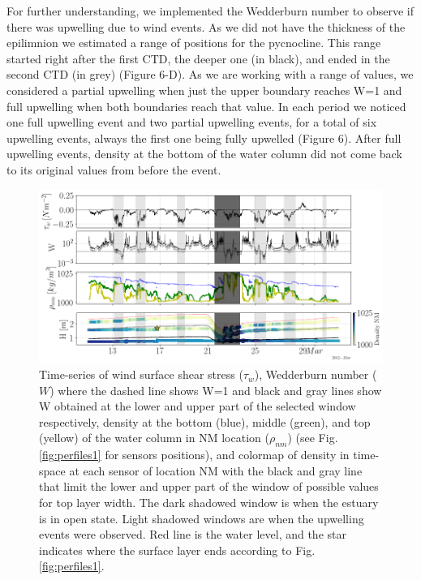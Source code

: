 \documentclass[tesis.tex]{subfiles}
\begin{document}
For further understanding, we implemented the Wedderburn number to observe if there was upwelling due to wind events. As we did not have the thickness of the epilimnion we estimated a range of positions for the pycnocline. This range started right after the first CTD, the deeper one (in black), and ended in the second CTD (in grey) (Figure 6-D). As we are working with a range of values, we considered a partial upwelling when just the upper boundary reaches W=1 and full upwelling when both boundaries reach that value. In each period we noticed one full upwelling event and two partial upwelling events, for a total of six upwelling events, always the first one being fully upwelled (Figure 6). After full upwelling events, density at the bottom of the water column did not come back to its original values from before the event. 

\begin{figure}[h!]
    \centering
    \includegraphics[width=\textwidth]{Imagenes/wedd.png}
    \caption{Time-series of wind surface shear stress ($\tau_w$), Wedderburn number ($W$) where the dashed line shows W=1 and black and gray lines show W obtained at the lower and upper part of the selected window respectively, density at the bottom (blue), middle (green), and top (yellow) of the water column in NM location ($\rho_{nm}$) (see Fig. \ref{fig:perfiles1} for sensors positions), and colormap of density in time-space at each sensor of location NM with the black and gray line that limit the lower and upper part of the window of possible values for top layer width. The dark shadowed window is when the estuary is in open state. Light shadowed windows are when the upwelling events were observed. Red line is the water level, and the star indicates where the surface layer ends according to Fig. \ref{fig:perfiles1}.}
    \label{fig:wedd}
\end{figure}
\end{document}
